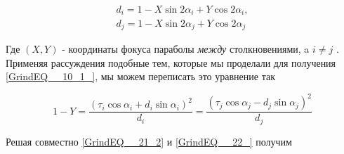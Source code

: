 \documentclass[a4paper]{article}
\begin{document}

\begin{equation} \label{GrindEQ__21_2} \begin{array}{l} {d_i=1-X \sin 2 \alpha _i+Y \cos 2 \alpha _i ,} \\ {d_j=1-X \sin 2 \alpha_j+Y \cos 2 \alpha _j } \end{array} \end{equation}

Где $\left(X,Y\right)$ - координаты фокуса параболы \textit{между} столкновениями, a $i\ne j$ . Применяя рассуждения подобные тем, которые мы проделали для получения \eqref{GrindEQ__10_1_}, мы можем переписать это уравнение так


\begin{equation} 
 \label{GrindEQ__22_} 
1-Y=\frac{(\tau_{i}  \cos \alpha_{i} +d_{i} \sin \alpha_{i} )^2}{d_{i}}=\frac{(\tau_{j}  \cos \alpha_{j} -d_{j} \sin \alpha_{j} )^2}{d_{j}}
\end{equation}
%
%

Решая совместно \eqref{GrindEQ__21_2} и \eqref{GrindEQ__22_} получим
\end{document}
